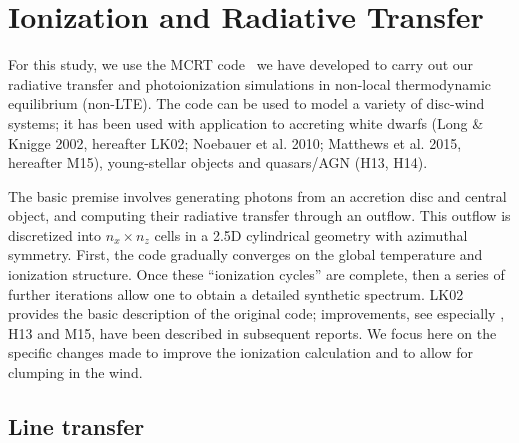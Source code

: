 \documentclass[useAMS,usenatbib]{mn2e_x}
\begin{document}

\section{Ionization and Radiative Transfer}

For this study, we use the MCRT code \py\ we have developed to carry out our 
radiative transfer and photoionization simulations in non-local thermodynamic
equilibrium (non-LTE). The code can be used to model a variety of
disc-wind systems; it has been used with application to accreting white dwarfs 
(Long \& Knigge 2002, hereafter LK02; Noebauer et al. 2010; 
Matthews et al. 2015, hereafter M15), young-stellar objects 
\citep{simmacro2005} and quasars/AGN (H13, H14).\nocite{noebauer, M15, LK02}  

The basic premise involves generating photons from an accretion disc
and central object, and computing their radiative transfer through an outflow.
This outflow is discretized into $n_x \times n_z$ cells in a 2.5D
cylindrical geometry with azimuthal symmetry.
First, the code gradually converges on the global temperature and ionization structure.
Once these ``ionization cycles'' are complete, then a series of further iterations
allow one to obtain a detailed synthetic spectrum.
LK02 provides the basic description of the original code; improvements, 
see especially \cite{simmacro2005}, H13 and M15, have been 
described in subsequent reports.  
We focus here on the specific changes made to improve the ionization calculation 
and to allow for clumping in the wind.


\subsection{Line transfer}
\end{document}
